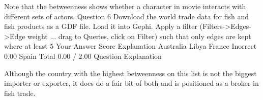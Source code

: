 Note that the betweenness shows whether a character in movie interacts with different sets of actors.
Question 6
Download the world trade data for fish and fish products as a GDF file. Load it into Gephi. Apply a filter (Filters->Edges->Edge weight ... drag to Queries, click on Filter) such that only edges are kept where at least 5%
Your Answer		Score	Explanation
Australia			
Libya			
France	Inorrect	0.00	
Spain			
Total		0.00 / 2.00	
Question Explanation

Although the country with the highest betweenness on this list is not the biggest importer or exporter, it does do a fair bit of both and is positioned as a broker in fish trade.

